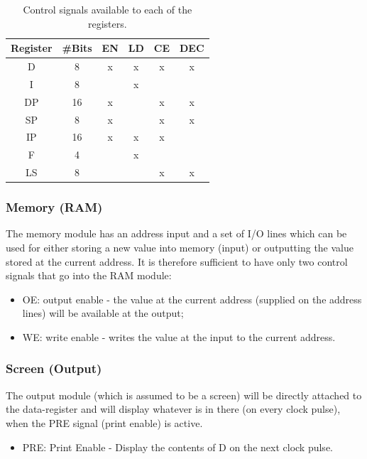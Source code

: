 \begin{table}[H]
  \centering
  \begin{tabular}{c|c|c|c|c|c}
    Register & \#Bits & EN  & LD  & CE  & DEC \\ \hline 
    D        & 8     & x & x & x & x \\
    I        & 8     &   & x &   &   \\
    DP       & 16    & x &   & x & x \\ 
    SP       & 8     & x &   & x & x \\ 
    IP       & 16    & x & x & x &   \\ 
    F        & 4     &   & x &   &   \\ 
    LS       & 8     &   &   & x & x \\ 
  \end{tabular}
  \caption{Control signals available to each of the registers.}
  \label{tab:registers}
\end{table}

\subsubsection{Memory (RAM)}  \label{sec:architecture:signals:ram}
The memory module has an address input and a set of I/O lines which can be used for either storing a new value into memory (input) or outputting the value stored at the current address. It is therefore sufficient to have only two control signals that go into the RAM module:
\begin{itemize}
\item OE: output enable - the value at the current address (supplied on the address lines) will be available at the output;
\item WE: write enable - writes the value at the input to the current address.
\end{itemize}

\subsubsection{Screen (Output)}  \label{sec:architecture:signals:output}
The output module (which is assumed to be a screen) will be directly attached to the data-register and will display whatever is in there (on every clock pulse), when the PRE signal (print enable) is active.
\begin{itemize}
\item PRE: Print Enable - Display the contents of D on the next clock pulse.
\end{itemize}


